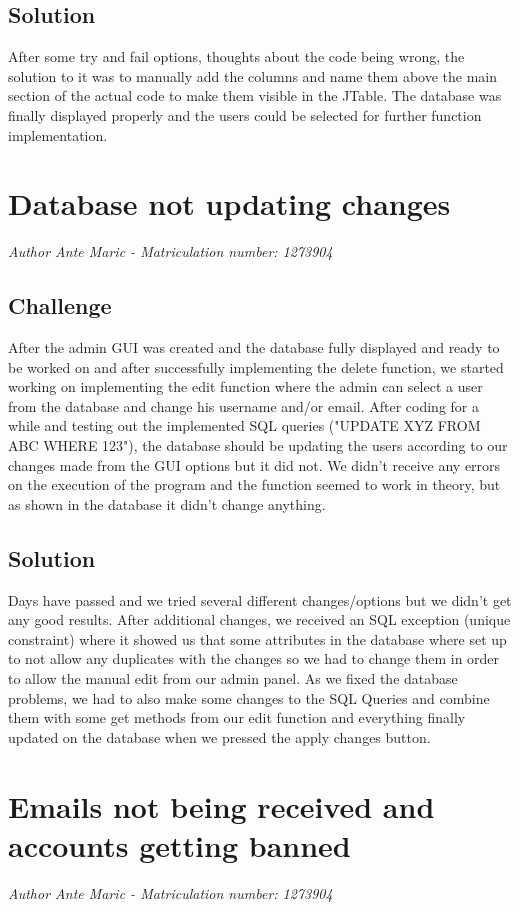 \subsection{Solution}
After some try and fail options, thoughts about the code being wrong, the solution to it was to manually add the columns and name them above the main section of the actual code to make them visible in the JTable. The database was finally displayed properly and the users could be selected for further function implementation.

\section{Database not updating changes}
\emph{Author Ante Maric - Matriculation number: 1273904}

\subsection{Challenge}
After the admin GUI was created and the database fully displayed and ready to be worked on and after successfully implementing the delete function, we started working on implementing the edit function where the admin can select a user from the database and change his username and/or email. After coding for a while and testing out the implemented SQL queries ("UPDATE XYZ FROM ABC WHERE 123"), the database should be updating the users according to our changes made from the GUI options but it did not. We didn't receive any errors on the execution of the program and the function seemed to work in theory, but as shown in the database it didn't change anything.


\subsection{Solution}
Days have passed and we tried several different changes/options but we didn't get any good results. After additional changes, we received an SQL exception (unique constraint) where it showed us that some attributes in the database where set up to not allow any duplicates with the changes so we had to change them in order to allow the manual edit from our admin panel. As we fixed the database problems, we had to also make some changes to the SQL Queries and combine them with some get methods from our edit function and everything finally updated on the database when we pressed the apply changes button.

\section{Emails not being received and accounts getting banned}
\emph{Author Ante Maric - Matriculation number: 1273904}

